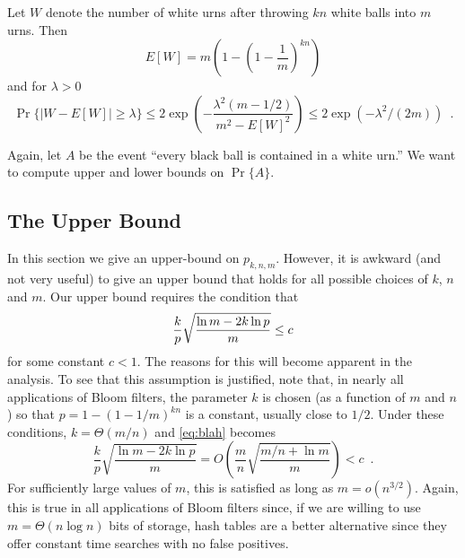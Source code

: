 \documentclass[lotsofwhite]{patmorin}
\newcommand{\blah}{\frac{k}{p}\sqrt{\frac{\ln m-2k\ln p}{m}}}
\begin{document}
\begin{thm}
Let $W$ denote the number of white urns after throwing $kn$ white balls into
$m$ urns. Then
\[
    E[W] = m\left(1-\left(1-\frac{1}{m}\right)^{kn}\right)
\]
and for $\lambda > 0$
\[
    \Pr\{|W - E[W]| \ge \lambda\} \le 2\exp\left(
        -\frac{\lambda^2(m-1/2)}{m^2-E[W]^2}\right) \le
2\exp(-\lambda^2/(2m)) \enspace .
\]
\end{thm}

Again, let $A$ be the event ``every black ball is contained in a white
urn.'' We want to compute upper and lower bounds on $\Pr\{A\}$.  

\subsection{The Upper Bound}

In this section we give an upper-bound on $p_{k,n,m}$. However, it is
awkward (and not very useful) to give an upper bound that holds for
all possible choices of $k$, $n$ and $m$.  Our upper bound requires
the condition that
\begin{equation}
	\blah \le c  \eqlabel{blah}
\end{equation}
for some constant $c < 1$.  The reasons for this will become apparent
in the analysis.  To see that this assumption is justified, note that,
in nearly all applications of Bloom filters, the parameter $k$ is
chosen (as a function of $m$ and $n$) so that $p=1-(1-1/m)^{kn}$ is a
constant, usually close to $1/2$. Under these conditions, $k = \Theta(m/n)$
and \eqref{eq:blah} becomes
\[
        \blah = O\left(\frac{m}{n}\sqrt{\frac{m/n+\ln m}{m}}\right) < c
\enspace .
\]
For sufficiently large values of $m$, this is satisfied as long as $m
= o(n^{3/2})$.  Again, this is true in all applications of Bloom
filters since, if we are willing to use $m=\Theta(n\log n)$ bits of
storage, hash tables are a better alternative since they offer
constant time searches with no false positives.
\end{document}
